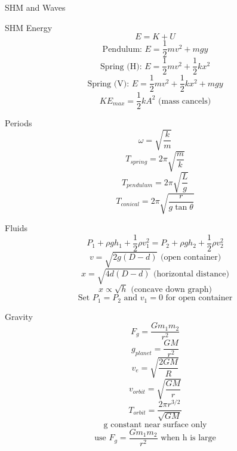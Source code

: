 SHM and Waves

SHM Energy
$$E = K + U$$
$$\text{Pendulum: } E = \frac{1}{2}mv^2 + mgy$$
$$\text{Spring (H): } E = \frac{1}{2}mv^2 + \frac{1}{2}kx^2$$
$$\text{Spring (V): } E = \frac{1}{2}mv^2 + \frac{1}{2}kx^2 + mgy$$
$$KE_{max} = \frac{1}{2}kA^2 \text{ (mass cancels)}$$

Periods
$$\omega = \sqrt{\frac{k}{m}}$$
$$T_{spring} = 2\pi\sqrt{\frac{m}{k}}$$
$$T_{pendulum} = 2\pi\sqrt{\frac{L}{g}}$$
$$T_{conical} = 2\pi\sqrt{\frac{r}{g\tan\theta}}$$

Fluids
$$P_1 + \rho gh_1 + \frac{1}{2}\rho v_1^2 = P_2 + \rho gh_2 + \frac{1}{2}\rho v_2^2$$
$$v = \sqrt{2g(D-d)} \text{ (open container)}$$
$$x = \sqrt{4d(D-d)} \text{ (horizontal distance)}$$
$$x \propto \sqrt{h} \text{ (concave down graph)}$$
$$\text{Set } P_1=P_2 \text{ and } v_1=0 \text{ for open container}$$

Gravity
$$F_g = \frac{Gm_1m_2}{r^2}$$
$$g_{planet} = \frac{GM}{r^2}$$
$$v_e = \sqrt{\frac{2GM}{R}}$$
$$v_{orbit} = \sqrt{\frac{GM}{r}}$$
$$T_{orbit} = \frac{2\pi r^{3/2}}{\sqrt{GM}}$$
$$\text{g constant near surface only}$$
$$\text{use } F_g = \frac{Gm_1m_2}{r^2} \text{ when h is large}$$
